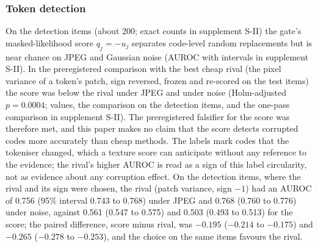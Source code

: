 \subsubsection{Token detection}
On the detection items (about 200; exact counts in supplement S-II) the gate's masked-likelihood score $q_j=-u_j$ separates
code-level random replacements but is near chance on JPEG and Gaussian noise (AUROC with intervals in supplement S-II).
In the preregistered comparison with the best cheap rival (the pixel variance of a token's patch, sign reversed, frozen and re-scored on the test
items) the score was below the rival under JPEG and under noise (Holm-adjusted $p=0.0004$; values, the comparison on the detection items, and the
one-pass comparison in supplement S-II).
The preregistered falsifier for the score was therefore met, and this paper makes no claim that the score detects corrupted codes more
accurately than cheap methods.
The labels mark codes that the tokeniser changed, which a texture score can anticipate without any reference to the evidence; the
rival's higher AUROC is read as a sign of this label circularity, not as evidence about any corruption effect.
On the detection items, where the rival and its sign were chosen, the rival (patch variance, sign $-1$) had an AUROC of 0.756 (95\% interval 0.743 to 0.768) under JPEG
and 0.768 (0.760 to 0.776) under noise, against 0.561 (0.547 to 0.575) and 0.503 (0.493 to 0.513) for the score; the paired difference, score minus rival, was $-0.195$
($-0.214$ to $-0.175$) and $-0.265$ ($-0.278$ to $-0.253$), and the choice on the same items favours the rival.

